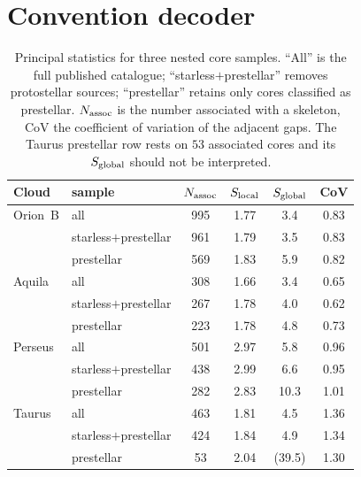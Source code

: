 \documentclass[usenatbib,twoside,twocolumn]{mnras}
\begin{document}
\section{Convention decoder}

\begin{table}
\caption{Principal statistics for three nested core samples. ``All'' is the full published catalogue; ``starless$+$prestellar'' removes protostellar sources; ``prestellar'' retains only cores classified as prestellar. $N_{\rm assoc}$ is the number associated with a skeleton, CoV the coefficient of variation of the adjacent gaps. The Taurus prestellar row rests on $53$ associated cores and its $S_{\rm global}$ should not be interpreted.}
\label{tab:popsplit}
\footnotesize
\setlength{\tabcolsep}{4pt}
\begin{tabular}{llcccc}
\toprule
Cloud & sample & $N_{\rm assoc}$ & $S_{\rm local}$ & $S_{\rm global}$ & CoV \\
\midrule
Orion~B & all                  & 995 & 1.77 & 3.4 & 0.83 \\
        & starless$+$prestellar& 961 & 1.79 & 3.5 & 0.83 \\
        & prestellar           & 569 & 1.83 & 5.9 & 0.82 \\
\midrule
Aquila  & all                  & 308 & 1.66 & 3.4 & 0.65 \\
        & starless$+$prestellar& 267 & 1.78 & 4.0 & 0.62 \\
        & prestellar           & 223 & 1.78 & 4.8 & 0.73 \\
\midrule
Perseus & all                  & 501 & 2.97 & 5.8 & 0.96 \\
        & starless$+$prestellar& 438 & 2.99 & 6.6 & 0.95 \\
        & prestellar           & 282 & 2.83 & 10.3 & 1.01 \\
\midrule
Taurus  & all                  & 463 & 1.81 & 4.5 & 1.36 \\
        & starless$+$prestellar& 424 & 1.84 & 4.9 & 1.34 \\
        & prestellar           &  53 & 2.04 & (39.5) & 1.30 \\
\bottomrule
\end{tabular}
\end{table}
\end{document}
